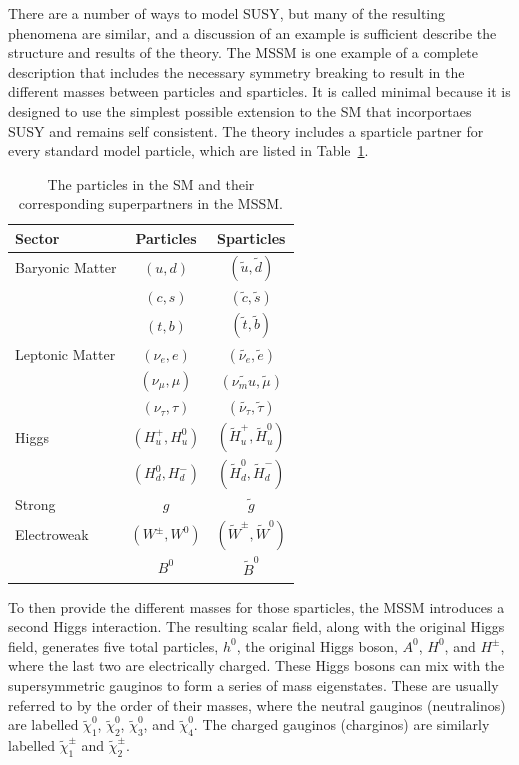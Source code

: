 There are a number of ways to model \ac{SUSY}, but many of the resulting phenomena are similar, and a discussion of an example is sufficient describe the structure and results of the theory.
The \ac{MSSM} is one example of a complete description that includes the necessary symmetry breaking to result in the different masses between particles and sparticles.
It is called minimal because it is designed to use the simplest possible extension to the \ac{SM} that incorportaes \ac{SUSY} and remains self consistent.
The theory includes a sparticle partner for every standard model particle, which are listed in Table~\ref{tab:sparticles}.

\begin{table}
\centering
\begin{tabular}{lcc}
\hline
Sector & Particles & Sparticles \\
\hline
Baryonic Matter & $(u,d)$ & $(\tilde{u},\tilde{d})$ \\
                & $(c,s)$ & $(\tilde{c},\tilde{s})$ \\
                & $(t,b)$ & $(\tilde{t},\tilde{b})$ \\
Leptonic Matter & $(\nu_e,e)$ & $(\tilde{\nu_e},\tilde{e})$ \\
                & $(\nu_\mu,\mu)$ & $(\tilde{\nu_mu},\tilde{\mu})$ \\
                & $(\nu_\tau,\tau)$ & $(\tilde{\nu_\tau},\tilde{\tau})$ \\
Higgs           & $(H_u^+, H_u^0)$ & $(\tilde{H}_u^+, \tilde{H}_u^0)$ \\
                & $(H_d^0, H_d^-)$ & $(\tilde{H}_d^0, \tilde{H}_d^-)$ \\
Strong          & $g$ & $\tilde{g}$ \\
Electroweak     & $(W^\pm, W^0)$ & $(\tilde{W}^\pm, \tilde{W}^0)$ \\
                & $B^0$ & $\tilde{B}^0$ \\
\end{tabular}
\caption{The particles in the \ac{SM} and their corresponding superpartners in the \ac{MSSM}.}
\label{tab:sparticles}
\end{table}

To then provide the different masses for those sparticles, the \ac{MSSM} introduces a second Higgs interaction.
The resulting scalar field, along with the original Higgs field, generates five total particles, $h^0$, the original Higgs boson, $A^0$, $H^0$, and $H^\pm$, where the last two are electrically charged.
These Higgs bosons can mix with the supersymmetric gauginos to form a series of mass eigenstates.
These are usually referred to by the order of their masses, where the neutral gauginos (neutralinos) are labelled $\tilde{\chi}_1^0$, $\tilde{\chi}_2^0$, $\tilde{\chi}_3^0$, and $\tilde{\chi}_4^0$. 
The charged gauginos (charginos) are similarly labelled $\tilde{\chi}_1^\pm$ and $\tilde{\chi}_2^\pm$. 

